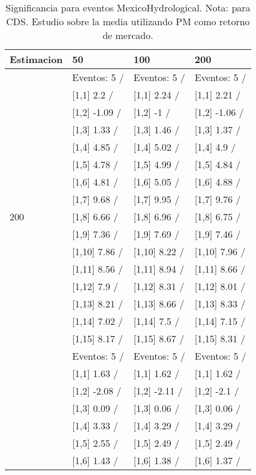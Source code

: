 \begin{table}

\caption{Significancia para eventos MexicoHydrological. Nota: para CDS. Estudio sobre la media utilizando PM como retorno de mercado.}
\centering
\begin{tabular}[t]{llll}
\toprule
Estimacion & 50 & 100 & 200\\
\midrule
 & Eventos:  5 / & Eventos:  5 / & Eventos:  5 /\\
 & {}[1,1] 2.2  / & {}[1,1] 2.24  / & {}[1,1] 2.21  /\\
 & {}[1,2] -1.09  / & {}[1,2] -1  / & {}[1,2] -1.06  /\\
 & {}[1,3] 1.33  / & {}[1,3] 1.46  / & {}[1,3] 1.37  /\\
 & {}[1,4] 4.85  / & {}[1,4] 5.02  / & {}[1,4] 4.9  /\\
\addlinespace
 & {}[1,5] 4.78  / & {}[1,5] 4.99  / & {}[1,5] 4.84  /\\
 & {}[1,6] 4.81  / & {}[1,6] 5.05  / & {}[1,6] 4.88  /\\
 & {}[1,7] 9.68  / & {}[1,7] 9.95  / & {}[1,7] 9.76  /\\
200 & {}[1,8] 6.66  / & {}[1,8] 6.96  / & {}[1,8] 6.75  /\\
 & {}[1,9] 7.36  / & {}[1,9] 7.69  / & {}[1,9] 7.46  /\\
\addlinespace
 & {}[1,10] 7.86  / & {}[1,10] 8.22  / & {}[1,10] 7.96  /\\
 & {}[1,11] 8.56  / & {}[1,11] 8.94  / & {}[1,11] 8.66  /\\
 & {}[1,12] 7.9  / & {}[1,12] 8.31  / & {}[1,12] 8.01  /\\
 & {}[1,13] 8.21  / & {}[1,13] 8.66  / & {}[1,13] 8.33  /\\
 & {}[1,14] 7.02  / & {}[1,14] 7.5  / & {}[1,14] 7.15  /\\
\addlinespace
 & {}[1,15] 8.17  / & {}[1,15] 8.67  / & {}[1,15] 8.31  /\\
 & Eventos:  5 / & Eventos:  5 / & Eventos:  5 /\\
 & {}[1,1] 1.63  / & {}[1,1] 1.62  / & {}[1,1] 1.62  /\\
 & {}[1,2] -2.08  / & {}[1,2] -2.11  / & {}[1,2] -2.1  /\\
 & {}[1,3] 0.09  / & {}[1,3] 0.06  / & {}[1,3] 0.06  /\\
\addlinespace
 & {}[1,4] 3.33  / & {}[1,4] 3.29  / & {}[1,4] 3.29  /\\
 & {}[1,5] 2.55  / & {}[1,5] 2.49  / & {}[1,5] 2.49  /\\
 & {}[1,6] 1.43  / & {}[1,6] 1.38  / & {}[1,6] 1.37  /\\

\end{tabular}
\end{table}
